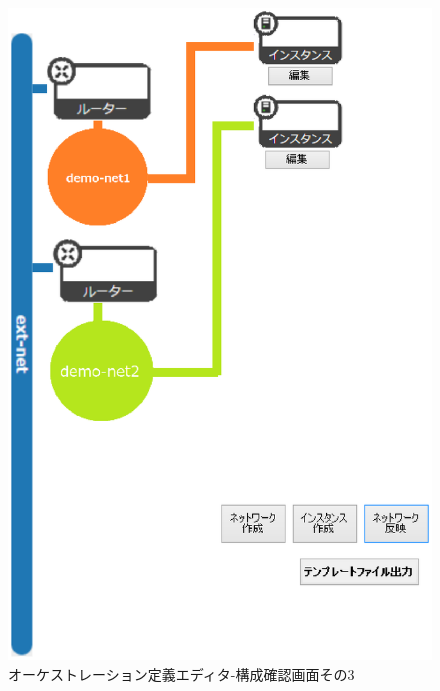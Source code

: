 \documentclass[mingoth]{kut-paper}		%
\begin{document}
		\begin{figure}[H]
			\begin{center}
				\includegraphics[scale=0.5]{Document/構成確認画面3.eps}
				\caption{オーケストレーション定義エディタ-構成確認画面その3}
				\label{pic:3}
			\end{center}
		\end{figure}
\end{document}
